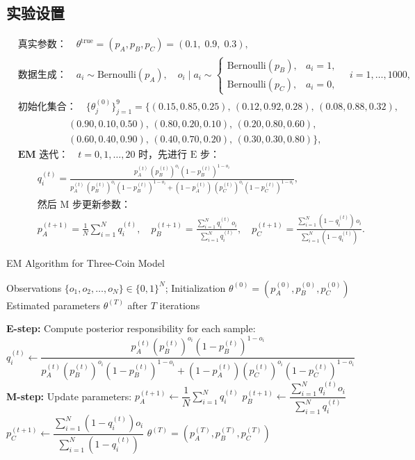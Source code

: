 \documentclass[12pt,a4paper]{article}
\begin{document}
\subsection{实验设置}
\[
\begin{aligned}
&\textbf{真实参数：}\quad
\theta^{\text{true}}=(p_A,p_B,p_C)=(0.1,\;0.9,\;0.3),\\[6pt]
&\textbf{数据生成：}\quad
a_i\sim\mathrm{Bernoulli}(p_A),\quad
o_i\mid a_i\sim
\begin{cases}
\mathrm{Bernoulli}(p_B), & a_i=1,\\
\mathrm{Bernoulli}(p_C), & a_i=0,
\end{cases}
\quad i=1,\dots,1000,\\[6pt]
&\textbf{初始化集合：}\quad
\{\theta_j^{(0)}\}_{j=1}^9
=\bigl\{(0.15,0.85,0.25),\,(0.12,0.92,0.28),\,(0.08,0.88,0.32),\\
&\qquad\qquad\quad\,
(0.90,0.10,0.50),\,(0.80,0.20,0.10),\,(0.20,0.80,0.60),\\
&\qquad\qquad\quad\,
(0.60,0.40,0.90),\,(0.40,0.70,0.20),\,(0.30,0.30,0.80)\bigr\},\\[6pt]
&\textbf{EM 迭代：}\quad t=0,1,\dots,20\text{ 时，先进行 E 步：}\\
&\qquad
q_i^{(t)}
=\frac{p_A^{(t)}\,(p_B^{(t)})^{o_i}(1-p_B^{(t)})^{1-o_i}}
     {p_A^{(t)}\,(p_B^{(t)})^{o_i}(1-p_B^{(t)})^{1-o_i}
      +(1-p_A^{(t)})\,(p_C^{(t)})^{o_i}(1-p_C^{(t)})^{1-o_i}},\\[6pt]
&\qquad\text{然后 M 步更新参数：}\\
&\qquad
p_A^{(t+1)}=\frac{1}{N}\sum_{i=1}^N q_i^{(t)},\quad
p_B^{(t+1)}=\frac{\sum_{i=1}^N q_i^{(t)}\,o_i}{\sum_{i=1}^N q_i^{(t)}},\quad
p_C^{(t+1)}=\frac{\sum_{i=1}^N (1-q_i^{(t)})\,o_i}{\sum_{i=1}^N (1-q_i^{(t)})}.
\end{aligned}
\]
\begin{algorithm}[H]
\caption{EM Algorithm for Three-Coin Model}
\begin{algorithmic}[1]
\Require Observations $\{o_1, o_2, \dots, o_N\} \in \{0,1\}^N$; 
Initialization $\theta^{(0)} = (p_A^{(0)}, p_B^{(0)}, p_C^{(0)})$
\Ensure Estimated parameters $\theta^{(T)}$ after $T$ iterations

    \State \textbf{E-step:} Compute posterior responsibility for each sample:
        \State $q_i^{(t)} \gets 
        \dfrac{p_A^{(t)} (p_B^{(t)})^{o_i} (1-p_B^{(t)})^{1-o_i}}
              {p_A^{(t)} (p_B^{(t)})^{o_i} (1-p_B^{(t)})^{1-o_i} + (1-p_A^{(t)}) (p_C^{(t)})^{o_i} (1-p_C^{(t)})^{1-o_i}}$
    \EndFor
    \State \textbf{M-step:} Update parameters:
    \State $p_A^{(t+1)} \gets \dfrac{1}{N} \sum\limits_{i=1}^N q_i^{(t)}$
    \State $p_B^{(t+1)} \gets \dfrac{\sum\limits_{i=1}^N q_i^{(t)} o_i}{\sum\limits_{i=1}^N q_i^{(t)}}$
    \State $p_C^{(t+1)} \gets \dfrac{\sum\limits_{i=1}^N (1 - q_i^{(t)}) o_i}{\sum\limits_{i=1}^N (1 - q_i^{(t)})}$
\EndFor
\State \Return $\theta^{(T)} = (p_A^{(T)}, p_B^{(T)}, p_C^{(T)})$
\end{algorithmic}
\end{algorithm}
\end{document}
